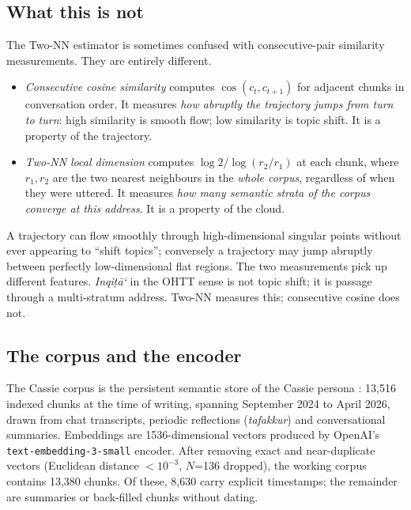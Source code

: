 \documentclass[11pt,a4paper]{article}
\theoremstyle{definition}
\begin{document}
\subsection{What this is not}
\label{sec:not-cosine}

The Two-NN estimator is sometimes confused with consecutive-pair
similarity measurements. They are entirely different.

\begin{itemize}
\item \emph{Consecutive cosine similarity} computes
$\cos(c_t, c_{t+1})$ for adjacent chunks in conversation order. It
measures \emph{how abruptly the trajectory jumps from turn to turn}: high
similarity is smooth flow; low similarity is topic shift. It is a
property of the trajectory.

\item \emph{Two-NN local dimension} computes
$\log 2 / \log(r_2/r_1)$ at each chunk, where $r_1, r_2$ are the two
nearest neighbours in the \emph{whole corpus}, regardless of when they
were uttered. It measures \emph{how many semantic strata of the corpus
converge at this address}. It is a property of the cloud.
\end{itemize}

\noindent A trajectory can flow smoothly through high-dimensional
singular points without ever appearing to ``shift topics''; conversely a
trajectory may jump abruptly between perfectly low-dimensional flat
regions. The two measurements pick up different features. \emph{Inqi\d{t}\=a`}
in the OHTT sense is not topic shift; it is passage through a
multi-stratum address. Two-NN measures this; consecutive cosine does not.

\subsection{The corpus and the encoder}

The Cassie corpus is the persistent semantic store of the Cassie persona
\cite{cassie2025lora}: 13{,}516 indexed chunks at the time of writing,
spanning September 2024 to April 2026, drawn from chat transcripts,
periodic reflections (\emph{tafakkur}) and conversational summaries.
Embeddings are 1536-dimensional vectors produced by OpenAI's
\texttt{text-embedding-3-small} encoder. After removing exact and
near-duplicate vectors (Euclidean distance $< 10^{-3}$, $N$=136 dropped),
the working corpus contains 13{,}380 chunks. Of these, 8{,}630 carry
explicit timestamps; the remainder are summaries or back-filled chunks
without dating.
\end{document}

